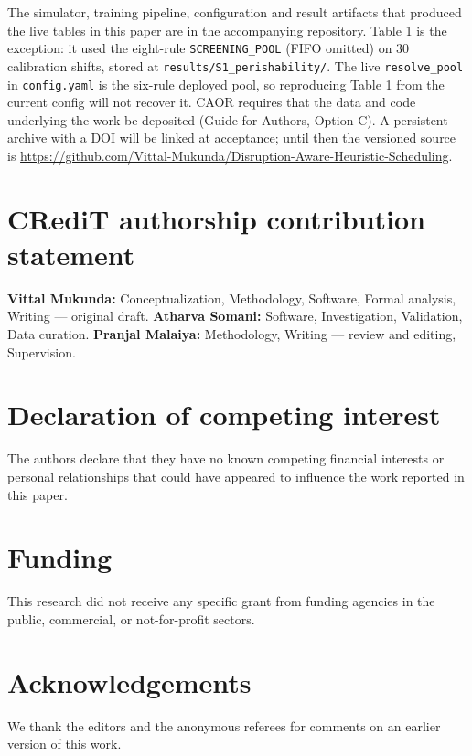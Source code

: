 \documentclass[review,3p,times]{elsarticle}
\theoremstyle{definition}
\begin{document}
The simulator, training pipeline, configuration and result artifacts
that produced the live tables in this paper are in the accompanying
repository. Table 1 is the exception: it used the eight-rule
\texttt{SCREENING\_POOL} (FIFO omitted) on 30 calibration shifts, stored
at \texttt{results/S1\_perishability/}. The live \texttt{resolve\_pool}
in \texttt{config.yaml} is the six-rule deployed pool, so reproducing
Table 1 from the current config will not recover it. CAOR requires that
the data and code underlying the work be deposited (Guide for Authors,
Option C). A persistent archive with a DOI will be linked at acceptance;
until then the versioned source is
\url{https://github.com/Vittal-Mukunda/Disruption-Aware-Heuristic-Scheduling}.

\section*{CRediT authorship contribution statement}

\textbf{Vittal Mukunda:} Conceptualization, Methodology, Software,
Formal analysis, Writing --- original draft. \textbf{Atharva Somani:}
Software, Investigation, Validation, Data curation. \textbf{Pranjal
Malaiya:} Methodology, Writing --- review and editing, Supervision.

\section*{Declaration of competing interest}

The authors declare that they have no known competing financial
interests or personal relationships that could have appeared to
influence the work reported in this paper.

\section*{Funding}

This research did not receive any specific grant from funding agencies
in the public, commercial, or not-for-profit sectors.

\section*{Acknowledgements}

We thank the editors and the anonymous referees for comments on an
earlier version of this work.
\end{document}
